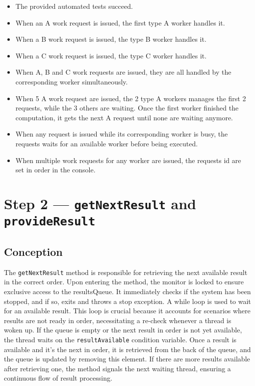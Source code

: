 \documentclass{article}
\begin{document}
    \begin{itemize}
        \item The provided automated tests succeed.
        \item When an A work request is issued, the first type A worker handles it.
        \item When a B work request is issued, the type B worker handles it.
        \item When a C work request is issued, the type C worker handles it.
        \item When A, B and C work requests are issued, they are all handled by the corresponding worker simultaneously.
        \item When 5 A work request are issued, the 2 type A workers manages the first 2 requests, while the 3 others are waiting. Once the first worker finished the computation, it gets the next A request until none are waiting anymore.
        \item When any request is issued while its corresponding worker is busy, the requests waits for an available worker before being executed.
        \item When multiple work requests for any worker are issued, the requests id are set in order in the console.
    \end{itemize}

    \section*{Step 2 --- \texttt{getNextResult} and \texttt{provideResult}}
    \subsection*{Conception}

    The \texttt{getNextResult} method is responsible for retrieving the next available result in the correct order.
    Upon entering the method, the monitor is locked to ensure exclusive access to the resultsQueue.
    It immediately checks if the system has been stopped, and if so, exits and throws a stop exception.
    A while loop is used to wait for an available result.
    This loop is crucial because it accounts for scenarios where results are not ready in order, necessitating a re-check whenever a thread is woken up.
    If the queue is empty or the next result in order is not yet available, the thread waits on the \texttt{resultAvailable} condition variable.
    Once a result is available and it's the next in order, it is retrieved from the back of the queue, and the queue is updated by removing this element.
    If there are more results available after retrieving one, the method signals the next waiting thread, ensuring a continuous flow of result processing.
\end{document}
